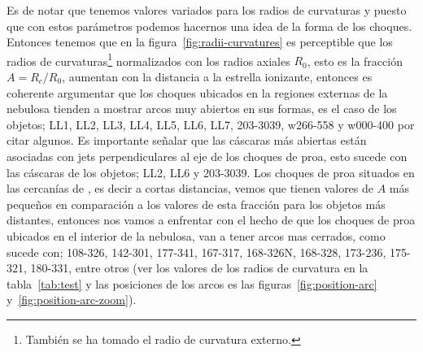 Es de notar que tenemos valores variados para los radios de curvaturas y puesto que con estos parámetros podemos hacernos una idea de la forma de los choques. Entonces tenemos que en la figura~\ref{fig:radii-curvatures} es perceptible que los radios de curvaturas\footnote{También se ha tomado el radio de curvatura externo.} normalizados con los radios axiales \(R_{0}\), esto es la fracción \(A=R_{c}/R_{0}\), aumentan con la distancia a la estrella ionizante, entonces es coherente argumentar que los choques ubicados en la regiones externas de la nebulosa tienden a mostrar arcos muy abiertos en sus formas, es el caso de los objetos; LL1, LL2, LL3, LL4, LL5, LL6, LL7,  203-3039, w266-558 y w000-400 por citar algunos. Es importante señalar que las cáscaras más abiertas están asociadas con jets perpendiculares al eje de los choques de proa, esto sucede con las cáscaras de los objetos; LL2, LL6 y 203-3039. Los choques de proa situados en las cercanías de \thC{}, es decir a cortas distancias, vemos que tienen valores de \(A\) más pequeños en comparación a los valores de esta fracción para los objetos más distantes, entonces nos vamos a enfrentar con el hecho de que los choques de proa ubicados en el interior de la nebulosa, van a tener arcos mas cerrados, como sucede con; 108-326, 142-301, 177-341, 167-317, 168-326N, 168-328, 173-236, 175-321, 180-331, entre otros (ver los valores de los radios de curvatura en la tabla~\ref{tab:test}  y las posiciones de los arcos es las figuras~\ref{fig:position-arc} y~\ref{fig:position-arc-zoom}).\\  

